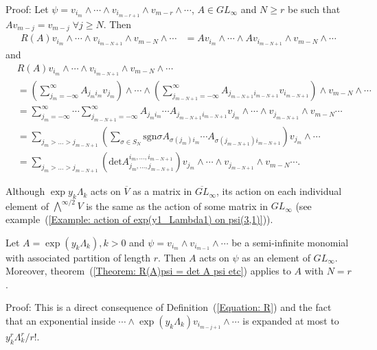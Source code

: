 Proof: Let $\psi=v_{i_m}\wedge\cdots \wedge v_{i_{m-r+1}}\wedge v_{m-r}\wedge\cdots$, $A\in GL_\infty$ and $N\geq r$ be such that $Av_{m-j}=v_{m-j}\;\forall j\geq N$. Then
\begin{equation}
\begin{split}
     R(A)v_{i_m}\wedge\cdots \wedge v_{i_{m-N+1}}\wedge v_{m-N}\wedge\cdots &=  Av_{i_m}\wedge\cdots \wedge Av_{i_{m-N+1}}\wedge v_{m-N}\wedge\cdots
\end{split}
\end{equation}
and
\begin{equation}\label{Equation: determinant monstrosity}
\begin{split}
     &R(A)v_{i_m}\wedge\cdots \wedge v_{i_{m-N+1}}\wedge v_{m-N}\wedge\cdots \\  &=\left(\sum_{j_m=-\infty}^\infty A_{j_mi_m}v_{j_m}\right)\wedge\cdots \wedge \left(\sum_{j_{m-N+1}=-\infty}^\infty A_{j_{m-N+1}i_{m-N+1}}v_{i_{m-N+1}}\right)\wedge v_{m-N}\wedge\cdots\\
     &=\sum_{j_m=-\infty}^\infty\cdots \sum_{j_{m-N+1}=-\infty}^\infty A_{j_mi_m}\cdots A_{j_{m-N+1}i_{m-N+1}}v_{j_m}\wedge\cdots \wedge v_{j_{m-N+1}}\wedge v_{m-N}\cdots\\
     &=\sum_{j_m>\dots >j_{m-N+1}}\left(\sum_{\sigma \in S_N}\text{sgn}\sigma A_{\sigma(j_m)i_m}\cdots  A_{\sigma(j_{m-N+1})i_{m-N+1}}\right)v_{j_m}\wedge\cdots\\
     &=\sum_{j_m>\dots >j_{m-N+1}} \left(\text{det}A_{j_m,\dots, j_{m-N+1}}^{i_m,\dots, i_{m-N+1}}\right)v_{j_m}\wedge\cdots \wedge v_{j_{m-N+1}}\wedge v_{m-N}\cdots.
\end{split}
\end{equation}



Although $\exp y_k\Lambda_k$ acts on $\overline{V}$ as a matrix in $\overline{GL}_\infty$, its action on each individual element of $\bigwedge^{\infty/2}V$ is the same as the action of some matrix in $GL_\infty$ (see example~(\ref{Example: action of exp(y1_Lambda1) on psi(3,1)})). 

\begin{dang}
    \begin{corollary}
        Let $A=\exp(y_k\Lambda_k), k>0$ and $\psi=v_{i_m}\wedge v_{i_{m-1}}\wedge\cdots$ be a semi-infinite monomial with associated partition of length $r$. Then $A$ acts on $\psi$ as an element of $GL_\infty$. Moreover, theorem~(\ref{Theorem: R(A)psi = det A psi etc}) applies to $A$ with $N=r$.
    \end{corollary}
\end{dang}
Proof: This is a direct consequence of Definition~(\ref{Equation: R}) and the fact that an exponential inside $\cdots\wedge\exp(y_k\Lambda_k)v_{i_{m-j+1}}\wedge\cdots$ is expanded at most to $y_k^r\Lambda_k^r/r!$.\par


